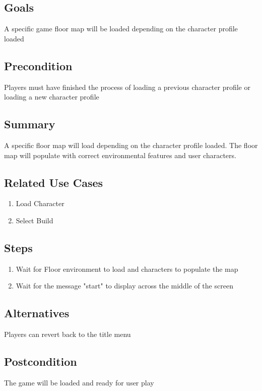 \documentclass[10pt]{article}
\begin{document}
		
		\subsection{Goals}
 		A specific game floor map will be loaded depending on the character profile loaded

		\subsection{Precondition}
 		Players must have finished the process of loading a previous character profile or loading a new character profile 

		\subsection{Summary}
		A specific floor map will load depending on the character profile loaded. The floor map will populate with correct environmental features and user characters.

		\subsection{Related Use Cases}
			\begin{enumerate}
			      \item Load Character
			      \item Select Build
			 \end{enumerate} 
	

        \subsection{Steps}
			\begin{enumerate}
			  \item Wait for Floor environment to load and characters to populate the map
			  \item Wait for the message "start" to display across the middle of the screen
			\end{enumerate}
			
		\subsection{Alternatives}
			Players can revert back to the title menu 
			
		\subsection{Postcondition}
			The game will be loaded and ready for user play 
\end{document}
